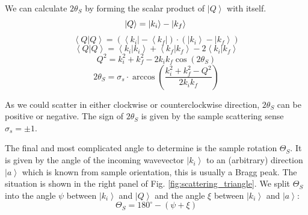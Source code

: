 We can calculate $2 \theta_S$ by forming the scalar product of $\left| Q \right>$ with itself.
\begin{equation} 
	\left| Q \right> = \left| k_i \right> - \left| k_f \right> \\ 
\end{equation}
\begin{equation} 
	\left< Q | Q \right> = \left( \left< k_i \right| - \left< k_f \right| \right) \cdot \left( \left| k_i \right> - \left| k_f \right> \right)
\end{equation}
\begin{equation} 
	\left< Q | Q \right> = \left< k_i | k_i \right> + \left< k_f | k_f \right> - 2 \left< k_i | k_f \right> 
\end{equation}
\begin{equation} 
	Q^2 = k_i^2 + k_f^2 - 2 k_i k_f \cos \left( 2 \theta_S \right) 
\end{equation}
\begin{equation}
	\boxed{ 2 \theta_S = \sigma_s \cdot \arccos \left( \frac{k_i^2 + k_f^2 - Q^2}{2 k_i k_f} \right) } 
\end{equation}

As we could scatter in either clockwise or counterclockwise direction, $2 \theta_S$ can be positive or negative.
The sign of $2 \theta_S$ is given by the sample scattering sense $\sigma_s = \pm 1$.


\vspace{0.5cm}


The final and most complicated angle to determine is the sample rotation $\Theta_S$.
It is given by the angle of the incoming wavevector $\left| k_i \right>$ to an (arbitrary) direction $\left| a \right>$ which is known from sample orientation, this is usually a Bragg peak. 
The situation is shown in the right panel of Fig. \ref{fig:scattering_triangle}.
We split $\Theta_S$ into the angle $\psi$ between $\left| k_i \right>$ and $\left| Q \right>$ and the angle $\xi$ between $\left| k_i \right>$ and $\left| a \right>$:
\begin{equation} \boxed{ \Theta_S = 180^{\circ} - \left( \psi + \xi \right) } \end{equation}


\vspace{0.5cm}


